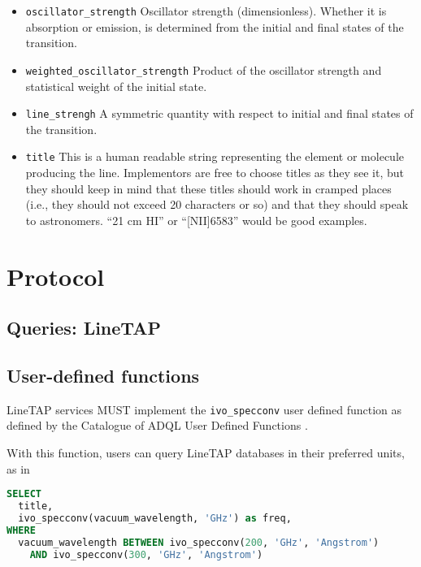 \documentclass[11pt,a4paper]{ivoa}
\begin{document}
\begin{itemize}
\item \texttt{oscillator\_strength} Oscillator strength (dimensionless).
Whether it is absorption or emission, is determined from the initial and
final states of the transition.

\item \texttt{weighted\_oscillator\_strength} Product of the oscillator strength and statistical weight of the initial state.

\item \texttt{line\_strengh} A symmetric quantity with respect to initial and final states of the transition.

\item \texttt{title} This is a human readable string representing the
element or molecule producing the line.  Implementors are free to choose
titles as they see it, but they should keep in mind that these titles
should work in cramped places (i.e., they should not exceed 20
characters or so) and that they should speak to astronomers.  ``21 cm
HI'' or ``[NII]6583'' would be good examples.

\end{itemize}


\section{Protocol}
\label{sec:Protocol}
\subsection{Queries: LineTAP}

\subsection{User-defined functions}

LineTAP services MUST implement the \texttt{ivo\_specconv} user defined
function as defined by the Catalogue of ADQL User Defined Functions
\citep{2021ivoa.spec.0310C}.

With this function, users can query LineTAP databases in their preferred
units, as in

\begin{lstlisting}[language=SQL]
SELECT 
  title,
  ivo_specconv(vacuum_wavelength, 'GHz') as freq,
WHERE
  vacuum_wavelength BETWEEN ivo_specconv(200, 'GHz', 'Angstrom') 
    AND ivo_specconv(300, 'GHz', 'Angstrom')
\end{lstlisting}
\end{document}
